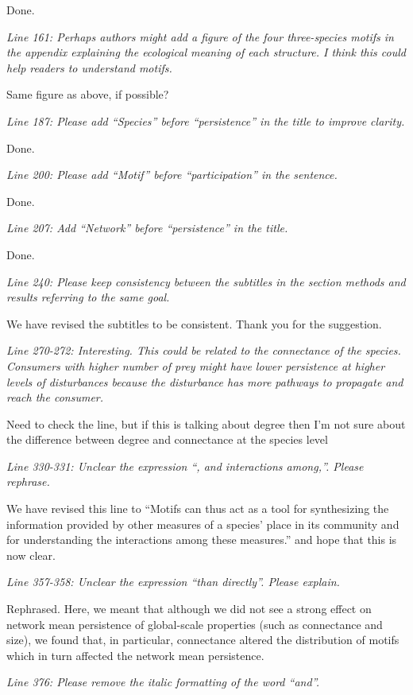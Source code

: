 \documentclass[12pt]{article}
\newcommand{\us}{\rm \setlength{\leftskip}{0.3cm} \setlength{\rightskip}{0.3cm}}
\newcommand{\them}{\it \setlength{\leftskip}{0cm} \setlength{\rightskip}{0cm}}
\begin{document}
\us
Done.

\them
Line 161: Perhaps authors might add a figure of the four three-species motifs in the appendix explaining the ecological meaning of each structure. I think this could help readers to understand motifs.

\us Same figure as above, if possible?

\them
Line 187: Please add “Species” before “persistence” in the title to improve clarity.

\us
Done.

\them
Line 200: Please add “Motif” before “participation” in the sentence.

\us
Done.

\them
Line 207: Add “Network” before “persistence” in the title.

\us
Done.

\them
Line 240: Please keep consistency between the subtitles in the section methods and results referring to the same goal.

\us We have revised the subtitles to be consistent. Thank you for the suggestion.

\them
Line 270-272: Interesting. This could be related to the connectance of the species. Consumers with higher number of prey might have lower persistence at higher levels of disturbances because the disturbance has more pathways to propagate and reach the consumer.

\us Need to check the line, but if this is talking about degree then I'm not sure about the difference between degree and connectance at the species level

\them
Line 330-331: Unclear the expression “, and interactions among,”. Please rephrase.

\us We have revised this line to ``Motifs can thus act as a tool for synthesizing the information provided by other measures of a species' place in its community and for understanding the interactions among these measures.'' and hope that this is now clear.

\them
Line 357-358: Unclear the expression “than directly”. Please explain.

\us
Rephrased. Here, we meant that although we did not see a strong effect on network mean persistence of global-scale properties (such as connectance and size), we found that, in particular, connectance altered the distribution of motifs which in turn affected the network mean persistence.  

\them
Line 376: Please remove the italic formatting of the word “and”.
\end{document}
